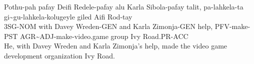 \begin{exe}
    \ex{} \gll{}Pothu-pah pafay Deifi Redele-pafay alu Karla Sibola-pafay talit, pa-lahkela-ta gi\~{}gu-lahkela-kolugeyle giled Aifi Rod-tay\\
                3SG-NOM with Davey Wreden-GEN and Karla Zimonja-GEN help, PFV-make-PST AGR\~{}ADJ-make-video.game group Ivy Road.PR-ACC\\
          \glt{}He, with Davey Wreden and Karla Zimonja's help, made the video game development organization Ivy Road.
\end{exe}

